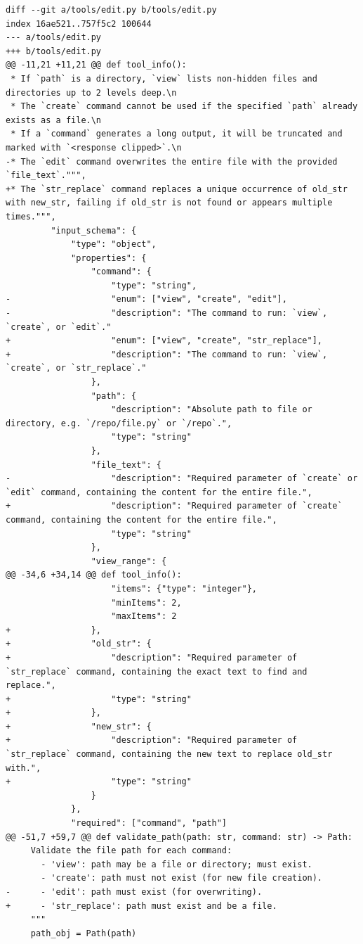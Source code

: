 \documentclass{article} %
\begin{document}
\begin{lstlisting}[style=diffstyle]
diff --git a/tools/edit.py b/tools/edit.py
index 16ae521..757f5c2 100644
--- a/tools/edit.py
+++ b/tools/edit.py
@@ -11,21 +11,21 @@ def tool_info():
 * If `path` is a directory, `view` lists non-hidden files and directories up to 2 levels deep.\n
 * The `create` command cannot be used if the specified `path` already exists as a file.\n
 * If a `command` generates a long output, it will be truncated and marked with `<response clipped>`.\n
-* The `edit` command overwrites the entire file with the provided `file_text`.""",
+* The `str_replace` command replaces a unique occurrence of old_str with new_str, failing if old_str is not found or appears multiple times.""",
         "input_schema": {
             "type": "object",
             "properties": {
                 "command": {
                     "type": "string",
-                    "enum": ["view", "create", "edit"],
-                    "description": "The command to run: `view`, `create`, or `edit`."
+                    "enum": ["view", "create", "str_replace"],
+                    "description": "The command to run: `view`, `create`, or `str_replace`."
                 },
                 "path": {
                     "description": "Absolute path to file or directory, e.g. `/repo/file.py` or `/repo`.",
                     "type": "string"
                 },
                 "file_text": {
-                    "description": "Required parameter of `create` or `edit` command, containing the content for the entire file.",
+                    "description": "Required parameter of `create` command, containing the content for the entire file.",
                     "type": "string"
                 },
                 "view_range": {
@@ -34,6 +34,14 @@ def tool_info():
                     "items": {"type": "integer"},
                     "minItems": 2,
                     "maxItems": 2
+                },
+                "old_str": {
+                    "description": "Required parameter of `str_replace` command, containing the exact text to find and replace.",
+                    "type": "string"
+                },
+                "new_str": {
+                    "description": "Required parameter of `str_replace` command, containing the new text to replace old_str with.",
+                    "type": "string"
                 }
             },
             "required": ["command", "path"]
@@ -51,7 +59,7 @@ def validate_path(path: str, command: str) -> Path:
     Validate the file path for each command:
       - 'view': path may be a file or directory; must exist.
       - 'create': path must not exist (for new file creation).
-      - 'edit': path must exist (for overwriting).
+      - 'str_replace': path must exist and be a file.
     """
     path_obj = Path(path)
 

\end{lstlisting}
\end{document}
